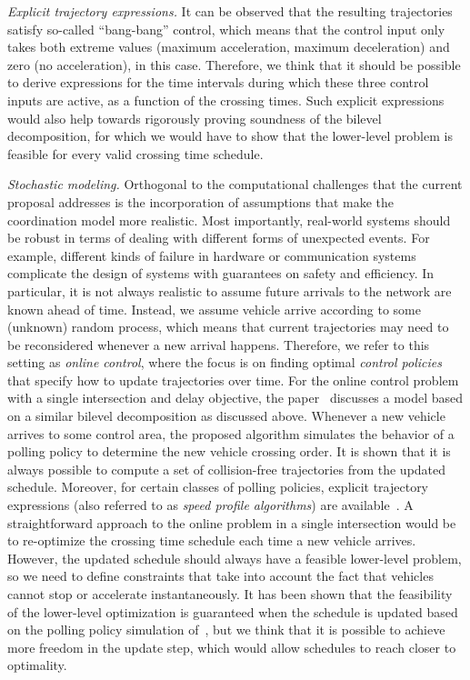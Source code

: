 \documentclass{article}
\theoremstyle{definition}
\theoremstyle{plain}
\begin{document}
\vspace{0.5em}\noindent
\textit{Explicit trajectory expressions.}
It can be observed that the resulting trajectories satisfy so-called
``bang-bang'' control, which means that the control input only takes both
extreme values (maximum acceleration, maximum deceleration) and zero (no
acceleration), in this case. Therefore, we think that it should be possible to
derive expressions for the time intervals during which these three control
inputs are active, as a function of the crossing times.
%
Such explicit expressions would also help towards rigorously proving soundness
of the bilevel decomposition, for which we would have to show that the
lower-level problem is feasible for every valid crossing time schedule.

\vspace{0.5em}\noindent
\textit{Stochastic modeling.}
Orthogonal to the computational challenges that the current proposal addresses
is the incorporation of assumptions that make the coordination model more
realistic. Most importantly, real-world systems should be robust in terms of
dealing with different forms of unexpected events. For example, different kinds
of failure in hardware or communication systems complicate the design of systems
with guarantees on safety and efficiency.
%
In particular, it is not always realistic to assume future arrivals to the network are known
ahead of time. Instead, we assume vehicle arrive according to some (unknown)
random process, which means that current trajectories may need to be
reconsidered whenever a new arrival happens. Therefore, we refer to this setting
as \textit{online control}, where the focus is on finding optimal \textit{control policies} that
specify how to update trajectories over time.
%
For the online control problem with a single intersection and delay objective,
the paper~\cite{miculescuPollingsystemsbasedAutonomousVehicle2016} discusses a
model based on a similar bilevel decomposition as discussed above. Whenever a
new vehicle arrives to some control area, the proposed algorithm simulates the
behavior of a polling policy to determine the new vehicle crossing order. It is
shown that it is always possible to compute a set of collision-free trajectories
from the updated schedule. Moreover, for certain classes of polling policies,
explicit trajectory expressions (also referred to as \textit{speed profile
  algorithms}) are available~\cite{timmermanPlatoonFormingAlgorithms2021}.
A straightforward approach to the online problem in a single intersection would
be to re-optimize the crossing time schedule each time a new vehicle arrives.
However, the updated schedule should always have a feasible lower-level problem,
so we need to define constraints that take into account the fact that vehicles
cannot stop or accelerate instantaneously. It has been shown that the
feasibility of the lower-level optimization is guaranteed when the schedule is
updated based on the polling policy simulation
of~\cite{miculescuPollingsystemsbasedAutonomousVehicle2016}, but we think that
it is possible to achieve more freedom in the update step, which would allow
schedules to reach closer to optimality.
\end{document}
